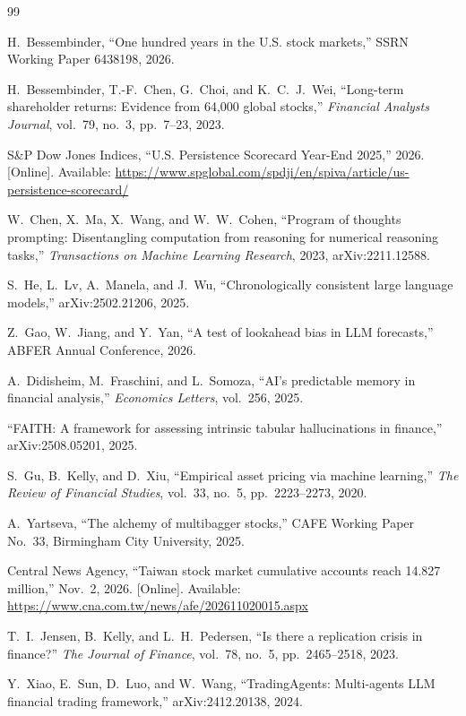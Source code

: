 \documentclass[conference]{IEEEtran}
\begin{document}
\begin{thebibliography}{99}

 H.~Bessembinder, ``One hundred years in the U.S. stock markets,'' SSRN Working Paper 6438198, 2026.

 H.~Bessembinder, T.-F.~Chen, G.~Choi, and K.~C.~J.~Wei, ``Long-term shareholder returns: Evidence from 64,000 global stocks,'' \emph{Financial Analysts Journal}, vol.~79, no.~3, pp.~7--23, 2023.

 S\&P Dow Jones Indices, ``U.S. Persistence Scorecard Year-End 2025,'' 2026. [Online]. Available: \url{https://www.spglobal.com/spdji/en/spiva/article/us-persistence-scorecard/}

 W.~Chen, X.~Ma, X.~Wang, and W.~W.~Cohen, ``Program of thoughts prompting: Disentangling computation from reasoning for numerical reasoning tasks,'' \emph{Transactions on Machine Learning Research}, 2023, arXiv:2211.12588.

 S.~He, L.~Lv, A.~Manela, and J.~Wu, ``Chronologically consistent large language models,'' arXiv:2502.21206, 2025.

 Z.~Gao, W.~Jiang, and Y.~Yan, ``A test of lookahead bias in LLM forecasts,'' ABFER Annual Conference, 2026.

 A.~Didisheim, M.~Fraschini, and L.~Somoza, ``AI's predictable memory in financial analysis,'' \emph{Economics Letters}, vol.~256, 2025.

 ``FAITH: A framework for assessing intrinsic tabular hallucinations in finance,'' arXiv:2508.05201, 2025.

 S.~Gu, B.~Kelly, and D.~Xiu, ``Empirical asset pricing via machine learning,'' \emph{The Review of Financial Studies}, vol.~33, no.~5, pp.~2223--2273, 2020.

 A.~Yartseva, ``The alchemy of multibagger stocks,'' CAFE Working Paper No.~33, Birmingham City University, 2025.

 Central News Agency, ``Taiwan stock market cumulative accounts reach 14.827 million,'' Nov.~2, 2026. [Online]. Available: \url{https://www.cna.com.tw/news/afe/202611020015.aspx}

 T.~I.~Jensen, B.~Kelly, and L.~H.~Pedersen, ``Is there a replication crisis in finance?'' \emph{The Journal of Finance}, vol.~78, no.~5, pp.~2465--2518, 2023.

 Y.~Xiao, E.~Sun, D.~Luo, and W.~Wang, ``TradingAgents: Multi-agents LLM financial trading framework,'' arXiv:2412.20138, 2024.


\end{thebibliography}
\end{document}
